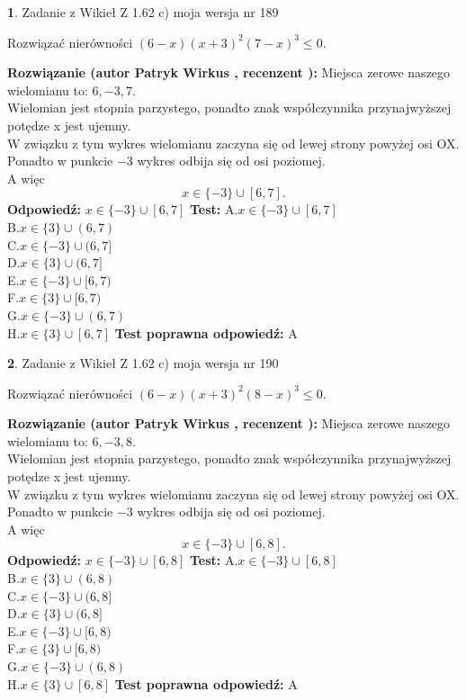 \documentclass[12pt, a4paper]{article}
\theoremstyle{definition} %
\newtheorem{zad}{}
\newcommand{\zadStart}[1]{\begin{zad}#1\newline}
\newcommand{\zadStop}{\end{zad}}
\newcommand{\rozwStart}[2]{\noindent \textbf{Rozwiązanie (autor #1 , recenzent #2): }\newline}
\newcommand{\rozwStop}{\newline}
\newcommand{\odpStart}{\noindent \textbf{Odpowiedź:}\newline}
\newcommand{\odpStop}{\newline}
\newcommand{\testStart}{\noindent \textbf{Test:}\newline}
\newcommand{\testStop}{\newline}
\newcommand{\kluczStart}{\noindent \textbf{Test poprawna odpowiedź:}\newline}
\newcommand{\kluczStop}{\newline}
\begin{document}
\zadStart{Zadanie z Wikieł Z 1.62 c) moja wersja nr 189}

Rozwiązać nierówności $(6-x)(x+3)^{2}(7-x)^{3}\le0$.
\zadStop
\rozwStart{Patryk Wirkus}{}
Miejsca zerowe naszego wielomianu to: $6, -3, 7$.\\
Wielomian jest stopnia parzystego, ponadto znak współczynnika przy\linebreak najwyższej potędze x jest ujemny.\\ W związku z tym wykres wielomianu zaczyna się od lewej strony powyżej osi OX.\\
Ponadto w punkcie $-3$ wykres odbija się od osi poziomej.\\
A więc $$x \in \{-3\} \cup [6,7].$$
\rozwStop
\odpStart
$x \in \{-3\} \cup [6,7]$
\odpStop
\testStart
A.$x \in \{-3\} \cup [6,7]$\\
B.$x \in \{3\} \cup (6,7)$\\
C.$x \in \{-3\} \cup (6,7]$\\
D.$x \in \{3\} \cup (6,7]$\\
E.$x \in \{-3\} \cup [6,7)$\\
F.$x \in \{3\} \cup [6,7)$\\
G.$x \in \{-3\} \cup (6,7)$\\
H.$x \in \{3\} \cup [6,7]$
\testStop
\kluczStart
A
\kluczStop



\zadStart{Zadanie z Wikieł Z 1.62 c) moja wersja nr 190}

Rozwiązać nierówności $(6-x)(x+3)^{2}(8-x)^{3}\le0$.
\zadStop
\rozwStart{Patryk Wirkus}{}
Miejsca zerowe naszego wielomianu to: $6, -3, 8$.\\
Wielomian jest stopnia parzystego, ponadto znak współczynnika przy\linebreak najwyższej potędze x jest ujemny.\\ W związku z tym wykres wielomianu zaczyna się od lewej strony powyżej osi OX.\\
Ponadto w punkcie $-3$ wykres odbija się od osi poziomej.\\
A więc $$x \in \{-3\} \cup [6,8].$$
\rozwStop
\odpStart
$x \in \{-3\} \cup [6,8]$
\odpStop
\testStart
A.$x \in \{-3\} \cup [6,8]$\\
B.$x \in \{3\} \cup (6,8)$\\
C.$x \in \{-3\} \cup (6,8]$\\
D.$x \in \{3\} \cup (6,8]$\\
E.$x \in \{-3\} \cup [6,8)$\\
F.$x \in \{3\} \cup [6,8)$\\
G.$x \in \{-3\} \cup (6,8)$\\
H.$x \in \{3\} \cup [6,8]$
\testStop
\kluczStart
A
\kluczStop
\end{document}
